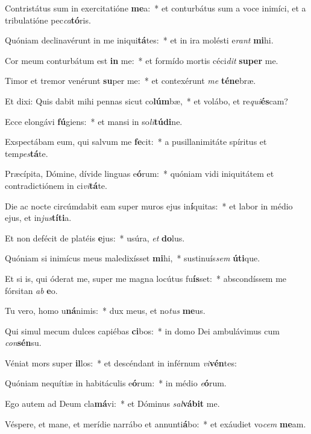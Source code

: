 \item Contristátus sum in exercitatióne \textbf{me}a:~* et conturbátus sum a voce inimíci, et a tribulatióne pec\textit{ca}\textbf{tó}ris.
\item Quóniam declinavérunt in me iniqui\textbf{tá}tes:~* et in ira molésti e\textit{rant} \textbf{mi}hi.
\item Cor meum conturbátum est \textbf{in} me:~* et formído mortis céci\textit{dit} \textbf{su}\textbf{per} me.
\item Timor et tremor venérunt \textbf{su}per me:~* et contexérunt \textit{me} \textbf{té}\textbf{ne}bræ.
\item Et dixi: Quis dabit mihi pennas sicut co\textbf{lúm}bæ,~* et volábo, et re\textit{qui}\textbf{és}cam?
\item Ecce elongávi \textbf{fú}giens:~* et mansi in so\textit{li}\textbf{tú}\textbf{di}ne.
\item Exspectábam eum, qui salvum me \textbf{fe}cit:~* a pusillanimitáte spíritus et tem\textit{pes}\textbf{tá}te.
\item Præcípita, Dómine, dívide linguas e\textbf{ó}rum:~* quóniam vidi iniquitátem et contradictiónem in ci\textit{vi}\textbf{tá}te.
\item Die ac nocte circúmdabit eam super muros ejus in\textbf{í}quitas:~* et labor in médio ejus, et in\textit{jus}\textbf{tí}\textbf{ti}a.
\item Et non defécit de platéis \textbf{e}jus:~* usúra, \textit{et} \textbf{do}lus.
\item Quóniam si inimícus meus maledixísset \textbf{mi}hi,~* sustinuís\textit{sem} \textbf{ú}\textbf{ti}que.
\item Et si is, qui óderat me, super me magna locútus fu\textbf{ís}set:~* abscondíssem me fórsitan \textit{ab} \textbf{e}o.
\item Tu vero, homo u\textbf{ná}nimis:~* dux meus, et no\textit{tus} \textbf{me}us.
\item Qui simul mecum dulces capiébas \textbf{ci}bos:~* in domo Dei ambulávimus cum \textit{con}\textbf{sén}su.
\item Véniat mors super \textbf{il}los:~* et descéndant in inférnum \textit{vi}\textbf{vén}tes:
\item Quóniam nequítiæ in habitáculis e\textbf{ó}rum:~* in médio \textit{e}\textbf{ó}rum.
\item Ego autem ad Deum cla\textbf{má}vi:~* et Dóminus \textit{sal}\textbf{vá}\textbf{bit} me.
\item Véspere, et mane, et merídie narrábo et annunti\textbf{á}bo:~* et exáudiet vo\textit{cem} \textbf{me}am.
